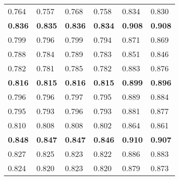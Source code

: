 \begin{tabular}{llllll}
\toprule
 0.764       & 0.757       & 0.768       & 0.758       & 0.834       & 0.830       \\
 \bfseries 0.836 & \bfseries 0.835 & \bfseries 0.836 & \bfseries 0.834 & \bfseries 0.908 & \bfseries 0.908 \\
 0.799       & 0.796       & 0.799       & 0.794       & 0.871       & 0.869       \\
 0.788       & 0.784       & 0.789       & 0.783       & 0.851       & 0.846       \\
 0.782       & 0.781       & 0.785       & 0.782       & 0.883       & 0.876       \\
 \bfseries 0.816 & \bfseries 0.815 & \bfseries 0.816 & \bfseries 0.815 & \bfseries 0.899 & \bfseries 0.896 \\
 0.796       & 0.796       & 0.797       & 0.795       & 0.889       & 0.884       \\
 0.795       & 0.793       & 0.796       & 0.793       & 0.881       & 0.877       \\
 0.810       & 0.808       & 0.808       & 0.802       & 0.864       & 0.861       \\
 \bfseries 0.848 & \bfseries 0.847 & \bfseries 0.847 & \bfseries 0.846 & \bfseries 0.910 & \bfseries 0.907 \\
 0.827       & 0.825       & 0.823       & 0.822       & 0.886       & 0.883       \\
 0.824       & 0.820       & 0.823       & 0.820       & 0.879       & 0.873       \\
\bottomrule
\end{tabular}